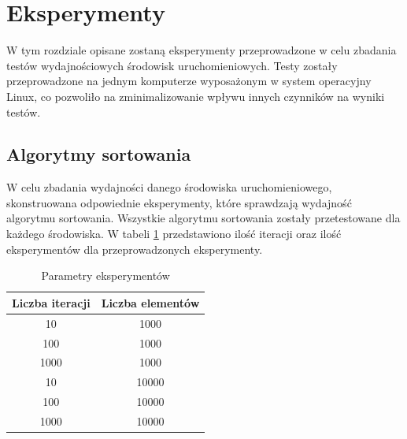 \section{Eksperymenty}
W tym rozdziale opisane zostaną eksperymenty przeprowadzone w celu zbadania testów wydajnościowych środowisk uruchomieniowych. Testy zostały przeprowadzone na jednym komputerze wyposażonym w system operacyjny Linux, co pozwoliło na zminimalizowanie wpływu innych czynników na wyniki testów. 

\subsection{Algorytmy sortowania}
W celu zbadania wydajności danego środowiska uruchomieniowego, skonstruowana odpowiednie eksperymenty, które sprawdzają wydajność algorytmu sortowania. Wszystkie algorytmu sortowania zostały przetestowane dla każdego środowiska. W tabeli \ref{tab:sorting_experiments} przedstawiono ilość iteracji oraz ilość eksperymentów dla przeprowadzonych eksperymenty.

\begin{table}[H]
  \centering
  \begin{tabular}{|c|c|}
    \hline
    \textbf{Liczba iteracji} & \textbf{Liczba elementów} \\ \hline
    10 & 1000 \\ \hline
    100 & 1000 \\ \hline
    1000 & 1000 \\ \hline
    10 & 10000 \\ \hline
    100 & 10000 \\ \hline
    1000 & 10000 \\ \hline
  \end{tabular}
  \caption{Parametry eksperymentów}
  \label{tab:sorting_experiments}
\end{table}

